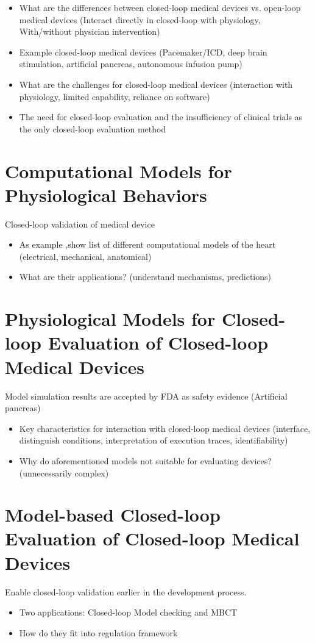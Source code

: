 \documentclass[a4paper]{article}
\begin{document}
\begin{itemize}
	\item What are the differences between closed-loop medical devices vs. open-loop medical devices (Interact directly in closed-loop with physiology, With/without physician intervention)
	\item Example closed-loop medical devices (Pacemaker/ICD, deep brain stimulation, artificial pancreas, autonomous infusion pump)
	\item What are the challenges for closed-loop medical devices (interaction with physiology, limited capability, reliance on software)
	\item The need for closed-loop evaluation and the insufficiency of clinical trials as the only closed-loop evaluation method
\end{itemize}

\section{Computational Models for Physiological Behaviors}
Closed-loop validation of medical device
\begin{itemize}
	\item As example ,show list of different computational models of the heart (electrical, mechanical, anatomical)
	\item What are their applications? (understand mechanisms, predictions)
\end{itemize}

\section{Physiological Models for Closed-loop Evaluation of Closed-loop Medical Devices}
Model simulation results are accepted by FDA as safety evidence (Artificial pancreas)
\begin{itemize}
	\item Key characteristics for interaction with closed-loop medical devices (interface, distinguish conditions, interpretation of execution traces, identifiability)
	\item Why do aforementioned models not suitable for evaluating devices? (unnecessarily complex)
\end{itemize}

\section{Model-based Closed-loop Evaluation of Closed-loop Medical Devices}
Enable closed-loop validation earlier in the development process.
\begin{itemize}
	\item Two applications: Closed-loop Model checking and MBCT
	\item How do they fit into regulation framework

\end{itemize}
\end{document}
